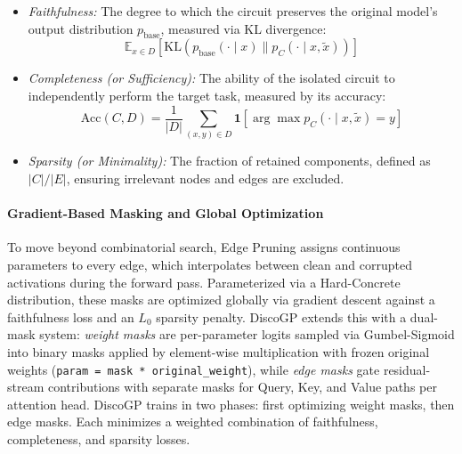 \documentclass[
    IMRAD=false,
	english,
	ruledheaders=section, %
	class=report, %
	thesis={type=bachelor}, %
	accentcolor=9c, %
	custommargins=false,%
	marginpar=false,%
	parskip=half,%
	fontsize=11pt,%
]{tudapub}
\begin{document}
\begin{itemize}
    \item \textit{Faithfulness:} The degree to which the circuit preserves the original model's output distribution $p_{\text{base}}$, measured via KL divergence: 
    \[ \mathbb{E}_{x \in D}\left[\text{KL}(p_{\text{base}}(\cdot \mid x) \parallel p_C(\cdot \mid x, \tilde{x}))\right] \]
    \item \textit{Completeness (or Sufficiency):} The ability of the isolated circuit to independently perform the target task, measured by its accuracy: 
    \[ \text{Acc}(C, D) = \frac{1}{|D|} \sum_{(x,y) \in D} \mathbf{1}[\arg\max p_C(\cdot \mid x, \tilde{x}) = y] \]
    \item \textit{Sparsity (or Minimality):} The fraction of retained components, defined as $|C| / |E|$, ensuring irrelevant nodes and edges are excluded.
\end{itemize}

\paragraph{Gradient-Based Masking and Global Optimization} To move beyond combinatorial search, Edge Pruning \citep{edgePruning} assigns continuous parameters to every edge, which interpolates between clean and corrupted activations during the forward pass. Parameterized via a Hard-Concrete distribution, these masks are optimized globally via gradient descent against a faithfulness loss and an $L_0$ sparsity penalty. DiscoGP \citep{yu-etal-2025-sheaf} extends this with a dual-mask system: \textit{weight masks} are per-parameter logits sampled via Gumbel-Sigmoid into binary masks applied by element-wise multiplication with frozen original weights (\texttt{param = mask * original\_weight}), while \textit{edge masks} gate residual-stream contributions with separate masks for Query, Key, and Value paths per attention head. DiscoGP trains in two phases: first optimizing weight masks, then edge masks. Each minimizes a weighted combination of faithfulness, completeness, and sparsity losses.



\end{document}

